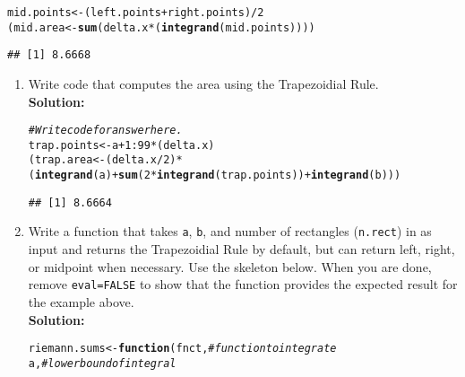 \documentclass{article}\usepackage[]{graphicx}\usepackage[]{xcolor}
\makeatletter
\newcommand{\hlnum}[1]{\textcolor[rgb]{0.686,0.059,0.569}{#1}}%
\newcommand{\hlcom}[1]{\textcolor[rgb]{0.678,0.584,0.686}{\textit{#1}}}%
\newcommand{\hlopt}[1]{\textcolor[rgb]{0,0,0}{#1}}%
\newcommand{\hldef}[1]{\textcolor[rgb]{0.345,0.345,0.345}{#1}}%
\newcommand{\hlkwa}[1]{\textcolor[rgb]{0.161,0.373,0.58}{\textbf{#1}}}%
\newcommand{\hlkwb}[1]{\textcolor[rgb]{0.69,0.353,0.396}{#1}}%
\newcommand{\hlkwc}[1]{\textcolor[rgb]{0.333,0.667,0.333}{#1}}%
\newcommand{\hlkwd}[1]{\textcolor[rgb]{0.737,0.353,0.396}{\textbf{#1}}}%
\newenvironment{kframe}{%
 \def\at@end@of@kframe{}%
 \ifinner\ifhmode%
  \def\at@end@of@kframe{\end{minipage}}%
  \begin{minipage}{\columnwidth}%
 \fi\fi%
 \def\FrameCommand##1{\hskip\@totalleftmargin \hskip-\fboxsep
 \colorbox{shadecolor}{##1}\hskip-\fboxsep
     \hskip-\linewidth \hskip-\@totalleftmargin \hskip\columnwidth}%
 \MakeFramed {\advance\hsize-\width
   \@totalleftmargin\z@ \linewidth\hsize
   \@setminipage}}%
 {\par\unskip\endMakeFramed%
 \at@end@of@kframe}
\newenvironment{knitrout}{}{} %
\makeatother
\begin{document}
\begin{enumerate}
\begin{knitrout}
\begin{kframe}
\begin{alltt}
\hldef{mid.points} \hlkwb{<-} \hldef{(left.points}\hlopt{+}\hldef{right.points)}\hlopt{/}\hlnum{2}
\hldef{(mid.area} \hlkwb{<-} \hlkwd{sum}\hldef{(delta.x}\hlopt{*}\hldef{(}\hlkwd{integrand}\hldef{(mid.points))))}
\end{alltt}
\begin{verbatim}
## [1] 8.6668
\end{verbatim}
\end{kframe}
\end{knitrout}
\newpage
\begin{enumerate}
  \item Write code that computes the area using the Trapezoidial Rule.\\
  \textbf{Solution:}
\begin{knitrout}\scriptsize
{}\color{fgcolor}\begin{kframe}
\begin{alltt}
\hlcom{# Write code for answer here.}
\hldef{trap.points} \hlkwb{<-} \hldef{a} \hlopt{+} \hlnum{1}\hlopt{:}\hlnum{99}\hlopt{*}\hldef{(delta.x)}
\hldef{(trap.area} \hlkwb{<-} \hldef{(delta.x}\hlopt{/}\hlnum{2}\hldef{)}\hlopt{*}\hldef{(}\hlkwd{integrand}\hldef{(a)}\hlopt{+}\hlkwd{sum}\hldef{(}\hlnum{2}\hlopt{*}\hlkwd{integrand}\hldef{(trap.points))}\hlopt{+}\hlkwd{integrand}\hldef{(b)))}
\end{alltt}
\begin{verbatim}
## [1] 8.6664
\end{verbatim}
\end{kframe}
\end{knitrout}
  \item Write a function that takes \texttt{a}, \texttt{b}, and number of 
  rectangles (\texttt{n.rect}) in as input and returns the Trapezoidial Rule 
  by default, but can return left, right, or midpoint when necessary. Use the
  skeleton below. When you are done, remove \texttt{eval=FALSE} to show that
  the function provides the expected result for the example above.\\
  \textbf{Solution:}
\begin{knitrout}\scriptsize
{}\color{fgcolor}\begin{kframe}
\begin{alltt}
\hldef{riemann.sums} \hlkwb{<-} \hlkwa{function}\hldef{(}\hlkwc{fnct}\hldef{,}                        \hlcom{# function to integrate}
                         \hlkwc{a}\hldef{,}                           \hlcom{# lower bound of integral}

\end{alltt}
\end{kframe}
\end{knitrout}
\end{enumerate}
\end{enumerate}
\end{document}
